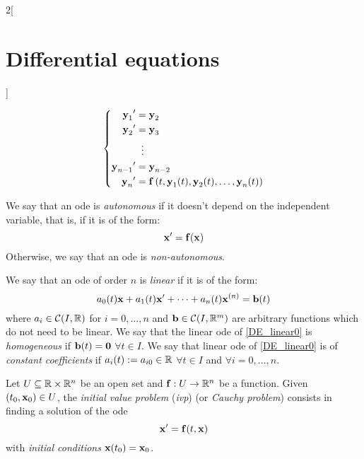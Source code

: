 \documentclass[../../../main.tex]{subfiles}
\begin{document}
\begin{multicols}{2}[\section{Differential equations}]
\begin{prop}
    \begin{equation*}
      \left\{
      \begin{aligned}
        {\boldsymbol{\mathrm{y}}_1}'     & =\boldsymbol{\mathrm{y}}_2                                                        \\
        {\boldsymbol{\mathrm{y}}_2}'     & =\boldsymbol{\mathrm{y}}_3                                                        \\
                        & \;\;\vdots                                                       \\
        {\boldsymbol{\mathrm{y}}_{n-1}}' & =\boldsymbol{\mathrm{y}}_{n-2}                                                    \\
        {\boldsymbol{\mathrm{y}}_n}'     & =\boldsymbol{\mathrm{f}}\left(t,\boldsymbol{\mathrm{y}}_1(t),\boldsymbol{\mathrm{y}}_2(t),\ldots,\boldsymbol{\mathrm{y}}_n(t)\right) \\
      \end{aligned}
      \right.
    \end{equation*}
  \end{prop}
  \begin{definition}
    We say that an ode is \emph{autonomous} if it doesn't depend on the independent variable, that is, if it is of the form: $$\boldsymbol{\mathrm{x}}'=\boldsymbol{\mathrm{f}}(\boldsymbol{\mathrm{x}})$$ Otherwise, we say that an ode is \emph{non-autonomous}.
  \end{definition}
  \begin{definition}
    We say that an ode of order $n$ is \emph{linear} if it is of the form:
    \begin{equation}\label{DE_linear0}
      a_0(t)\boldsymbol{\mathrm{x}}+a_1(t)\boldsymbol{\mathrm{x}}'+\cdots+a_n(t)\boldsymbol{\mathrm{x}}^{(n)}=\boldsymbol{\mathrm{b}}(t)
    \end{equation}
    where $a_i\in\mathcal{C}(I,\mathbb{R})$ for $i=0,\ldots,n$ and $\boldsymbol{\mathrm{b}}\in\mathcal{C}(I,\mathbb{R}^m)$ are arbitrary functions which do not need to be linear. We say that the linear ode of \cref{DE_linear0} is \emph{homogeneous} if $\boldsymbol{\mathrm{b}}(t)=\boldsymbol{\mathrm{0}}$ $\forall t\in I$. We say that linear ode of \cref{DE_linear0} is of \emph{constant coefficients} if $a_i(t):=a_{i0}\in\mathbb{R}$ $\forall t\in I$ and $\forall i=0,\ldots,n$.
  \end{definition}
  \begin{definition}
    Let $U\subseteq\mathbb{R}\times\mathbb{R}^n$ be an open set and $\boldsymbol{\mathrm{f}}:U\rightarrow\mathbb{R}^n$ be a function. Given $(t_0,\boldsymbol{\mathrm{x}}_0)\in U$, the \emph{initial value problem} (\emph{ivp}) (or \emph{Cauchy problem}) consists in finding a solution of the ode $$\boldsymbol{\mathrm{x}}'=\boldsymbol{\mathrm{f}}(t,\boldsymbol{\mathrm{x}})$$ with \emph{initial conditions} $\boldsymbol{\mathrm{x}}(t_0)=\boldsymbol{\mathrm{x}}_0$.
  \end{definition}

\end{multicols}
\end{document}
